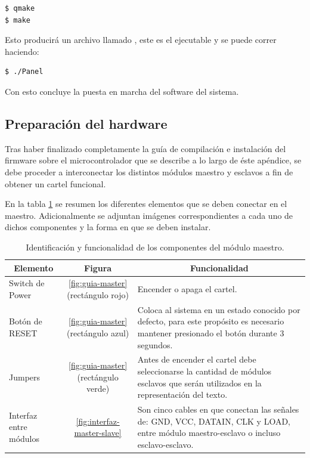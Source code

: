 \begin{lstlisting}
$ qmake
$ make
\end{lstlisting}

Esto producirá un archivo llamado , este es el ejecutable y se puede correr haciendo:

\begin{lstlisting}
$ ./Panel
\end{lstlisting}

Con esto concluye la puesta en marcha del software del sistema.

\newpage
\subsection{Preparación del hardware}

Tras haber finalizado completamente la guía de compilación e instalación del firmware sobre el microcontrolador que se describe a lo largo de éste apéndice, se debe proceder a interconectar los distintos módulos maestro y esclavos a fin de obtener un cartel funcional.

En la tabla \ref{table:uso-instalacion} se resumen los diferentes elementos que se deben conectar en el maestro. Adicionalmente se adjuntan imágenes correspondientes a cada uno de dichos componentes y la forma en que se deben instalar.

\begin{table}[ht!]
	\centering
	\caption{Identificación y funcionalidad de los componentes del módulo maestro.}
	\label{table:uso-instalacion}
	\begin{tabular}{lcp{}}
		\multicolumn{1}{c}{Elemento}	& Figura & \multicolumn{1}{c}{Funcionalidad} \\ \hline
		Switch de Power         		& \ref{fig:guia-master} (rectángulo rojo)	& Encender o apaga el cartel.  \\ \hline
		Botón de RESET      		& \ref{fig:guia-master} (rectángulo azul)	& Coloca al sistema en un estado conocido por defecto,  para este propósito es necesario mantener presionado el botón durante 3 segundos. \\ \hline
		Jumpers	& \ref{fig:guia-master} (rectángulo verde)	& Antes de encender el cartel debe seleccionarse la cantidad de módulos esclavos que serán utilizados en la representación del texto. \\ \hline
		Interfaz entre módulos 				& \ref{fig:interfaz-master-slave}			& Son cinco cables en que conectan las señales de: GND, VCC, DATAIN, CLK y LOAD, entre módulo maestro-esclavo o incluso esclavo-esclavo.
	\end{tabular}
\end{table}

